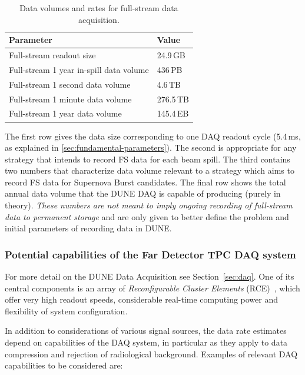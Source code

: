 \begin{table}[ht!]
	\centering
	\begin{tabular}{| p{3in} | p{1.1in} |}
		\hline	
	
	\textbf{Parameter} & \textbf{Value} \\ \hline
	Full-stream readout size & 24.9\,GB \\ \hline
	Full-stream 1 year in-spill data volume & 436\,PB \\ \hline
	Full-stream 1 second data volume & 4.6\,TB \\
	Full-stream 1 minute data volume & 276.5\,TB \\	\hline
	Full-stream 1 year data volume & 145.4\,EB \\ \hline
	\end{tabular}
	\caption{Data volumes and rates for full-stream data acquisition.}
	\label{tab:full-stream-volume}
\end{table}
The first row gives the data size corresponding to one DAQ readout cycle (5.4\,ms, as explained in \ref{sec:fundamental-parameters}).
The second is appropriate for any strategy that intends to record FS data for each beam spill.
The third contains two numbers that characterize data volume relevant to a strategy which aims
to record FS data for Supernova Burst candidates. The final row  shows the total annual data
volume that the DUNE DAQ is capable of producing (purely in theory).
\textit{These numbers are not meant to imply ongoing recording of full-stream
data to permanent storage} and are only given to better define the problem and initial parameters
of recording data in DUNE.


\subsubsection{Potential capabilities of the Far Detector TPC DAQ system}
\label{sec:daq-assumptions}
For more detail on the DUNE Data Acquisition see Section~\ref{sec:daq}. One of its central components
is an array of \textit{Reconfigurable Cluster Elements} (RCE)~\cite{slac_rce_1}, which offer very high
readout speeds, considerable real-time computing power and flexibility of system configuration.

In addition to considerations of various signal sources, the data rate estimates depend on capabilities of the DAQ system,
in particular as they apply to data compression and rejection of radiological background.
Examples of relevant DAQ capabilities to be considered are:

